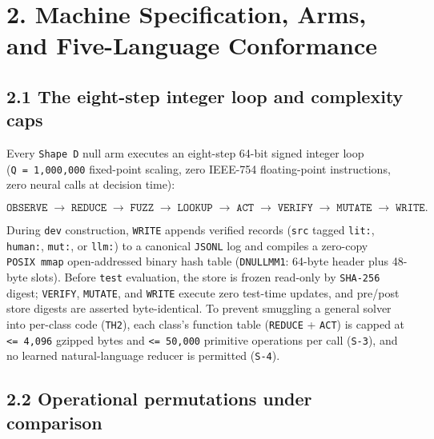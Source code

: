 \documentclass[10pt,letterpaper]{article}
\begin{document}
\section{2. Machine Specification, Arms, and Five-Language
Conformance}\label{machine-specification-arms-and-five-language-conformance}

\subsection{2.1 The eight-step integer loop and complexity
caps}\label{the-eight-step-integer-loop-and-complexity-caps}

Every \texttt{Shape\ D} null arm executes an eight-step 64-bit signed
integer loop (\texttt{Q\ =\ 1,\allowbreak{}000,\allowbreak{}000} fixed-point scaling, zero
IEEE-754 floating-point instructions, zero neural calls at decision
time):

\[\texttt{OBSERVE} \;\to\; \texttt{REDUCE} \;\to\; \texttt{FUZZ} \;\to\; \texttt{LOOKUP} \;\to\; \texttt{ACT} \;\to\; \texttt{VERIFY} \;\to\; \texttt{MUTATE} \;\to\; \texttt{WRITE}.\]

During \texttt{dev} construction, \texttt{WRITE} appends verified
records (\texttt{src} tagged \texttt{lit:}, \texttt{human:},
\texttt{mut:}, or \texttt{llm:}) to a canonical \texttt{JSONL} log and
compiles a zero-copy \texttt{POSIX\ mmap} open-addressed binary hash
table (\texttt{DNULLMM1}: 64-byte header plus 48-byte slots). Before
\texttt{test} evaluation, the store is frozen read-only by
\texttt{SHA-256} digest; \texttt{VERIFY}, \texttt{MUTATE}, and
\texttt{WRITE} execute zero test-time updates, and pre/post store
digests are asserted byte-identical. To prevent smuggling a general
solver into per-class code (\texttt{TH2}), each class's function table
(\texttt{REDUCE} + \texttt{ACT}) is capped at
\texttt{\textless{}=\ 4,096} gzipped bytes and
\texttt{\textless{}=\ 50,000} primitive operations per call
(\texttt{S-3}), and no learned natural-language reducer is permitted
(\texttt{S-4}).

\subsection{2.2 Operational permutations under
comparison}\label{operational-permutations-under-comparison}
\end{document}
